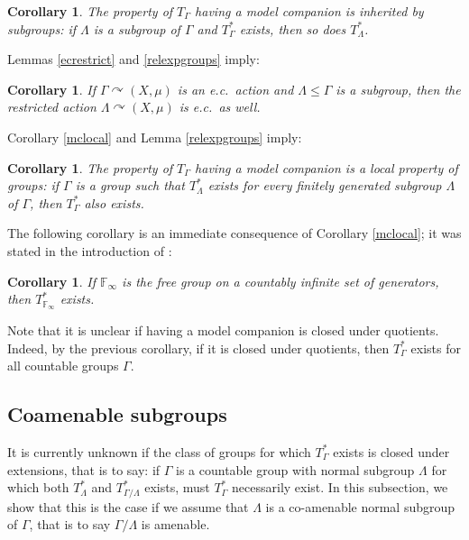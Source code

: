 \documentclass[12pt]{amsart}
\newtheorem{cor}[thm]{Corollary}
\theoremstyle{definition}
\def\bb{\mathbb}
\def\bb{\mathbb}
\newcommand{\acts}{\curvearrowright}
\begin{document}
\begin{cor} \label{cor:mc_sub}
The property of $T_\Gamma$ having a model companion is inherited by subgroups:  if $\Lambda$ is a subgroup of $\Gamma$ and $T_\Gamma^*$ exists, then so does $T_\Lambda^*$.
\end{cor}

Lemmas \ref{ecrestrict} and \ref{relexpgroups} imply:

\begin{cor}\label{restrictedec}
If $\Gamma \acts (X, \mu)$ is an e.c.\ action and $\Lambda \leq \Gamma$ is a subgroup, then the restricted action $\Lambda \acts (X, \mu)$ is e.c.\ as well.
\end{cor}

Corollary \ref{mclocal} and Lemma \ref{relexpgroups} imply:

\begin{cor}\label{mclocgroup}
The property of $T_\Gamma$ having a model companion is a local property of groups:  if $\Gamma$ is a group such that $T_\Lambda^*$ exists for every finitely generated subgroup $\Lambda$ of $\Gamma$, then $T_\Gamma^*$ also exists.
\end{cor}

The following corollary is an immediate consequence of Corollary \ref{mclocal}; it was stated in the introduction of \cite{BIH}:

\begin{cor}\label{freeinfgen}
If $\bb F_\infty$ is the free group on a countably infinite set of generators, then $T_{\bb F_{\infty}}^*$ exists.
\end{cor}

Note that it is unclear if having a model companion is closed under quotients.  Indeed, by the previous corollary, if it is closed under quotients, then $T_\Gamma^*$ exists for all countable groups $\Gamma$.

\subsection{Coamenable subgroups}

It is currently unknown if the class of groups for which $T_\Gamma^*$ exists is closed under extensions, that is to say: if $\Gamma$ is a countable group with normal subgroup $\Lambda$ for which both $T_\Lambda^*$ and $T_{\Gamma/\Lambda}^*$ exists, must $T_\Gamma^*$ necessarily exist.  In this subsection, we show that this is the case if we assume that $\Lambda$ is a co-amenable normal subgroup of $\Gamma$, that is to say $\Gamma/\Lambda$ is amenable.
\end{document}

